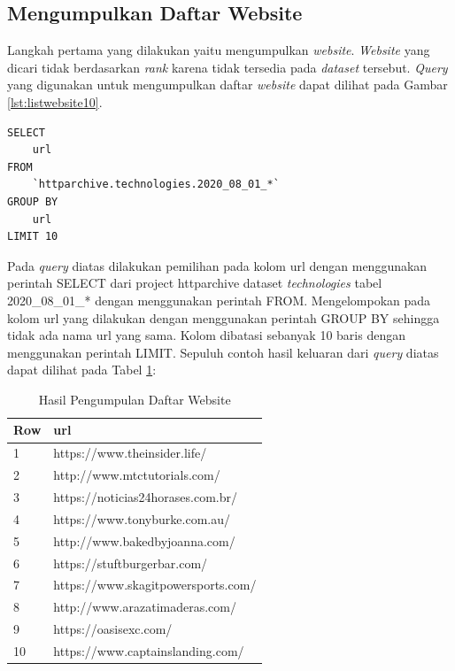 \subsection{Mengumpulkan Daftar Website}
Langkah pertama yang dilakukan yaitu mengumpulkan \textit{website}. \textit{Website} yang dicari tidak berdasarkan \textit{rank} karena tidak tersedia pada \textit{dataset} tersebut. \textit{Query} yang digunakan untuk mengumpulkan daftar \textit{website} dapat dilihat pada Gambar \ref{lst:listwebsite10}.
\begin{lstlisting}[caption={Mencari Daftar \textit{Website} Limit 10}, label={lst:listwebsite10}]
SELECT 
	url
FROM 
	`httparchive.technologies.2020_08_01_*`
GROUP BY 
	url
LIMIT 10
\end{lstlisting}

Pada \textit{query} diatas dilakukan pemilihan pada kolom url dengan menggunakan perintah SELECT dari project httparchive dataset \textit{technologies} tabel 2020\_08\_01\_* dengan menggunakan perintah FROM. Mengelompokan pada kolom url yang dilakukan dengan menggunakan perintah GROUP BY sehingga tidak ada nama url yang sama. Kolom dibatasi sebanyak 10 baris dengan menggunakan perintah LIMIT. Sepuluh contoh hasil keluaran dari \textit{query} diatas dapat dilihat pada Tabel \ref{table:contoh_langkah1}:

\begin{table}[H]
\centering
\begin{tabular}{|l|l|}
	\hline
	\textbf{Row} & \textbf{url}\\
	\hline
	1 & https://www.theinsider.life/\\
	\hline
	2 & http://www.mtctutorials.com/ \\
	\hline
	3 & https://noticias24horases.com.br/\\
	\hline
	4 & https://www.tonyburke.com.au/ \\
	\hline
	5 & http://www.bakedbyjoanna.com/\\
	\hline
	6 & https://stuftburgerbar.com/\\
	\hline
	7 & https://www.skagitpowersports.com/\\
	\hline
	8 & http://www.arazatimaderas.com/ \\
	\hline
	9 & https://oasisexc.com/\\
	\hline
	10 & https://www.captainslanding.com/\\
	\hline
\end{tabular}
\caption{Hasil Pengumpulan Daftar Website}
\label{table:contoh_langkah1}
\end{table}


